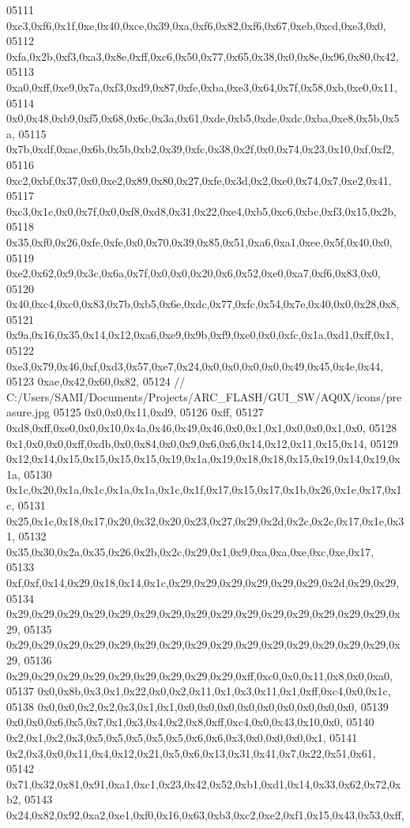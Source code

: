 \begin{DoxyCode}
05111   0xc3,0xf6,0x1f,0xe,0x40,0xce,0x39,0xa,0xf6,0x82,0xf6,0x67,0xeb,0xcd,0xe3,0x0,
05112   0xfa,0x2b,0xf3,0xa3,0x8e,0xff,0xc6,0x50,0x77,0x65,0x38,0x0,0x8e,0x96,0x80,0x42,
05113   0xa0,0xff,0xe9,0x7a,0xf3,0xd9,0x87,0xfe,0xba,0xe3,0x64,0x7f,0x58,0xb,0xe0,0x11,
05114   0x0,0x48,0xb9,0xf5,0x68,0x6c,0x3a,0x61,0xde,0xb5,0xde,0xdc,0xba,0xe8,0x5b,0x5a,
05115   0x7b,0xdf,0xac,0x6b,0x5b,0xb2,0x39,0xfc,0x38,0x2f,0x0,0x74,0x23,0x10,0xf,0xf2,
05116   0xc2,0xbf,0x37,0x0,0xe2,0x89,0x80,0x27,0xfe,0x3d,0x2,0xe0,0x74,0x7,0xe2,0x41,
05117   0xc3,0x1c,0x0,0x7f,0x0,0xf8,0xd8,0x31,0x22,0xe4,0xb5,0xc6,0xbc,0xf3,0x15,0x2b,
05118   0x35,0xf0,0x26,0xfe,0xfe,0x0,0x70,0x39,0x85,0x51,0xa6,0xa1,0xee,0x5f,0x40,0x0,
05119   0xe2,0x62,0x9,0x3c,0x6a,0x7f,0x0,0x0,0x20,0x6,0x52,0xe0,0xa7,0xf6,0x83,0x0,
05120   0x40,0xc4,0xc0,0x83,0x7b,0xb5,0x6e,0xdc,0x77,0xfc,0x54,0x7e,0x40,0x0,0x28,0x8,
05121   0x9a,0x16,0x35,0x14,0x12,0xa6,0xe9,0x9b,0xf9,0xe0,0x0,0xfc,0x1a,0xd1,0xff,0x1,
05122   0xe3,0x79,0x46,0xf,0xd3,0x57,0xe7,0x24,0x0,0x0,0x0,0x0,0x49,0x45,0x4e,0x44,
05123   0xae,0x42,0x60,0x82,
05124     \textcolor{comment}{// C:/Users/SAMI/Documents/Projects/ARC\_FLASH/GUI\_SW/AQ0X/icons/preasure.jpg}
05125   0x0,0x0,0x11,0xd9,
05126   0xff,
05127   0xd8,0xff,0xe0,0x0,0x10,0x4a,0x46,0x49,0x46,0x0,0x1,0x1,0x0,0x0,0x1,0x0,
05128   0x1,0x0,0x0,0xff,0xdb,0x0,0x84,0x0,0x9,0x6,0x6,0x14,0x12,0x11,0x15,0x14,
05129   0x12,0x14,0x15,0x15,0x15,0x15,0x19,0x1a,0x19,0x18,0x18,0x15,0x19,0x14,0x19,0x1a,
05130   0x1c,0x20,0x1a,0x1c,0x1a,0x1a,0x1c,0x1f,0x17,0x15,0x17,0x1b,0x26,0x1e,0x17,0x1c,
05131   0x25,0x1c,0x18,0x17,0x20,0x32,0x20,0x23,0x27,0x29,0x2d,0x2c,0x2c,0x17,0x1e,0x31,
05132   0x35,0x30,0x2a,0x35,0x26,0x2b,0x2c,0x29,0x1,0x9,0xa,0xa,0xe,0xc,0xe,0x17,
05133   0xf,0xf,0x14,0x29,0x18,0x14,0x1c,0x29,0x29,0x29,0x29,0x29,0x29,0x2d,0x29,0x29,
05134   0x29,0x29,0x29,0x29,0x29,0x29,0x29,0x29,0x29,0x29,0x29,0x29,0x29,0x29,0x29,0x29,
05135   0x29,0x29,0x29,0x29,0x29,0x29,0x29,0x29,0x29,0x29,0x29,0x29,0x29,0x29,0x29,0x29,
05136   0x29,0x29,0x29,0x29,0x29,0x29,0x29,0x29,0x29,0xff,0xc0,0x0,0x11,0x8,0x0,0xa0,
05137   0x0,0x8b,0x3,0x1,0x22,0x0,0x2,0x11,0x1,0x3,0x11,0x1,0xff,0xc4,0x0,0x1c,
05138   0x0,0x0,0x2,0x2,0x3,0x1,0x1,0x0,0x0,0x0,0x0,0x0,0x0,0x0,0x0,0x0,
05139   0x0,0x0,0x6,0x5,0x7,0x1,0x3,0x4,0x2,0x8,0xff,0xc4,0x0,0x43,0x10,0x0,
05140   0x2,0x1,0x2,0x3,0x5,0x5,0x5,0x5,0x5,0x6,0x6,0x3,0x0,0x0,0x0,0x1,
05141   0x2,0x3,0x0,0x11,0x4,0x12,0x21,0x5,0x6,0x13,0x31,0x41,0x7,0x22,0x51,0x61,
05142   0x71,0x32,0x81,0x91,0xa1,0xc1,0x23,0x42,0x52,0xb1,0xd1,0x14,0x33,0x62,0x72,0xb2,
05143   0x24,0x82,0x92,0xa2,0xe1,0xf0,0x16,0x63,0xb3,0xc2,0xe2,0xf1,0x15,0x43,0x53,0xff,

\end{DoxyCode}
